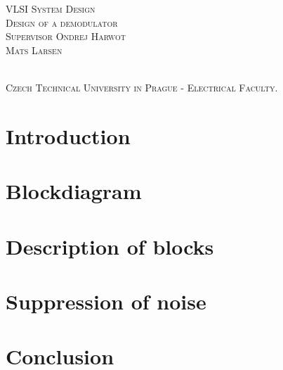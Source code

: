 



%

\begin{titlingpage}
\begin{center}
\vspace*{5\onelineskip}
\vspace*{5\onelineskip}
{ \baselineskip=24pt
{\Huge \textsc{VLSI System Design }}\\
\vspace*{2\onelineskip}
{\large \textsc{Design of a demodulator}}\\
{\large \textsc{Supervisor Ondrej Harwot }}\\
\vspace*{4\onelineskip}
\large\textsc{Mats Larsen}\par}
\vfill
\vspace*{2\onelineskip}
 \quad \hfill
{}
\vspace{2\onelineskip} \\
\small
\textsc{Czech Technical University in Prague - Electrical Faculty.}\\
\end{center}
\end{titlingpage}
\tableofcontents*

\chapter{Introduction}

\chapter{Blockdiagram}

\chapter{Description of blocks}

\chapter{Suppression of noise}

\chapter{Conclusion}

